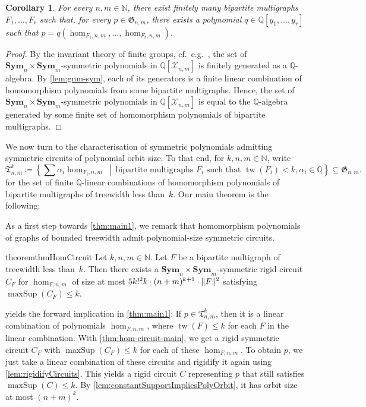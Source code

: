 \documentclass[11pt, DIV=15]{scrarticle}
\theoremstyle{definition}
\theoremstyle{plain}
\newtheorem{corollary}[definition]{Corollary}
\theoremstyle{remark}
\DeclarePairedDelimiter{\norm}{\lVert}{\rVert}
\DeclareMathOperator{\tw}{tw}
\newcommand{\Sym}{\mathbf{Sym}}
\DeclareMathOperator{\maxSup}{maxSup}
\begin{document}
	\begin{corollary}
		For every $n,m \in \mathbb{N}$,
		there exist finitely many bipartite multigraphs $F_1, \dots, F_r$ such that, for every $p \in \mathfrak{G}_{n,m}$,
		there exists a polynomial $q \in \mathbb{Q}[y_1, \dots, y_r]$ such that 
		\(
		p = q(\hom_{F_1, n,m}, \dots, \hom_{F_r, n,m}).
		\)
	\end{corollary}
	\begin{proof}
		By the invariant theory of finite groups, cf.\ e.g.\ \cite[Proposition~3.0.1]{derksen_computational_2015}, 
		the set of $\Sym_n \times \Sym_m$-symmetric polynomials in $\mathbb{Q}[\mathcal{X}_{n,m}]$ is finitely generated as a $\mathbb{Q}$-algebra.
		By \cref{lem:gnm-sym}, each of its generators is a finite linear combination of homomorphism polynomials from some bipartite multigraphs.
		Hence, the set of $\Sym_n \times \Sym_m$-symmetric polynomials in $\mathbb{Q}[\mathcal{X}_{n,m}]$ is equal to the $\mathbb{Q}$-algebra generated by some finite set of homomorphism polynomials of bipartite multigraphs.
	\end{proof}
	
	We now turn to the characterisation of symmetric polynomials admitting symmetric circuits of polynomial orbit size.
	To that end, for $k,n,m \in \mathbb{N}$, write
	\[
		\mathfrak{T}_{n,m}^k \coloneqq \left\{\sum \alpha_i \hom_{F_i, n,m} \ \middle|\  \text{bipartite multigraphs } F_i \text{ such that } \tw(F_i) < k, \alpha_i \in \mathbb{Q} \right\} \subseteq \mathfrak{G}_{n,m}.
	\]
	for the set of finite $\mathbb{Q}$-linear combinations of homomorphism polynomials of bipartite multigraphs of treewidth less than~$k$.
	Our main theorem is the following:

	\thmMain*
	
	As a first step towards \cref{thm:main1}, we remark that homomorphism polynomials of graphs of bounded treewidth admit polynomial-size symmetric circuits. 
	
	\begin{restatable}{theorem}{thmHomCircuit}\label{thm:hom-circuit-main}
		Let $k, n, m \in \mathbb{N}$.
		Let $F$ be a bipartite multigraph of treewidth less than~$k$.
		Then there exists a $\Sym_n \times \Sym_{m}$-symmetric rigid circuit $C_F$ for $\hom_{F,n,m}$ of size at most $5k!^2k \cdot (n+m)^{k+1} \cdot \norm{F}^2$ satisfying $\maxSup(C_F) \leq k$.
	\end{restatable}
	
	 yields the forward implication in \cref{thm:main1}: If $p \in \mathfrak{T}_{n,m}^k$, then it is a linear combination of polynomials $\hom_{F,n,m}$, where $\tw(F) \leq k$ for each $F$ in the linear combination. With \cref{thm:hom-circuit-main}, we get a rigid symmetric circuit $C_F$ with $\maxSup(C_F) \leq k$ for each of these $\hom_{F,n,m}$. To obtain $p$, we just take a linear combination of these circuits and rigidify it again using \cref{lem:rigidifyCircuits}. This yields a rigid circuit $C$ representing $p$ that still satisfies $\maxSup(C) \leq k$. By \cref{lem:constantSupportImpliesPolyOrbit}, it has orbit size at most $(n+m)^k$.  
	
\end{document}

